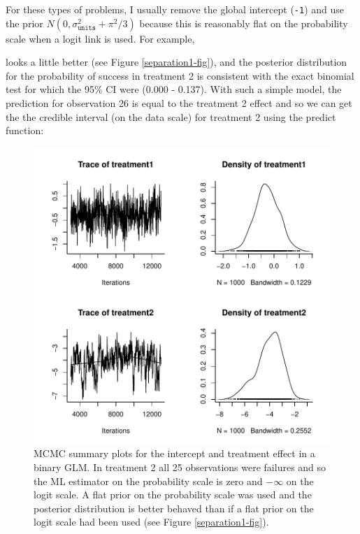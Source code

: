 \documentclass{article}
\begin{document}
For these types of problems, I usually remove the global intercept (\texttt{-1}) and use the prior $N(0, \sigma^{2}_{\texttt{units}}+\pi^2/3)$ because this is reasonably flat on the probability scale when a logit link is used. For example,

\begin{Schunk}
\end{Schunk}

looks a little better (see Figure \ref{separation1-fig}), and the posterior distribution for the probability of success in treatment 2 is consistent with the exact binomial test for which the 95\% CI were (0.000 - 0.137). With such a simple model, the prediction for observation 26 is equal to the  treatment 2 effect and so we can get the the credible interval (on the data scale) for treatment 2 using the predict function:



\begin{figure}[!h]
\begin{center}
\includegraphics{Lecture2-085}
\end{center}
\caption{MCMC summary plots for the intercept and treatment effect in a binary GLM. In treatment 2 all 25 observations were failures and so the ML estimator on the probability scale is zero and $-\infty$ on the logit scale. A flat prior on the probability scale was used and the posterior distribution is better behaved than if a flat prior on the logit scale had been used (see Figure \ref{separation1-fig}).}
\label{separation2-fig}
\end{figure}
\end{document}
